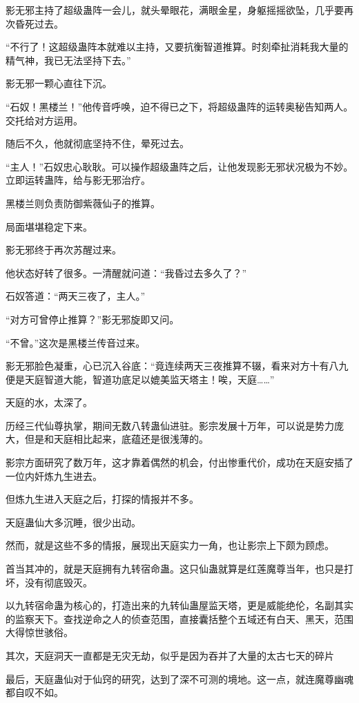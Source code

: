 \begin{this_body}
影无邪主持了超级蛊阵一会儿，就头晕眼花，满眼金星，身躯摇摇欲坠，几乎要再次昏死过去。

“不行了！这超级蛊阵本就难以主持，又要抗衡智道推算。时刻牵扯消耗我大量的精气神，我已无法坚持下去。”

影无邪一颗心直往下沉。

“石奴！黑楼兰！”他传音呼唤，迫不得已之下，将超级蛊阵的运转奥秘告知两人。交托给对方运用。

随后不久，他就彻底坚持不住，晕死过去。

“主人！”石奴忠心耿耿。可以操作超级蛊阵之后，让他发现影无邪状况极为不妙。立即运转蛊阵，给与影无邪治疗。

黑楼兰则负责防御紫薇仙子的推算。

局面堪堪稳定下来。

影无邪终于再次苏醒过来。

他状态好转了很多。一清醒就问道：“我昏过去多久了？”

石奴答道：“两天三夜了，主人。”

“对方可曾停止推算？”影无邪旋即又问。

“不曾。”这次是黑楼兰传音过来。

影无邪脸色凝重，心已沉入谷底：“竟连续两天三夜推算不辍，看来对方十有八九便是天庭智道大能，智道功底足以媲美监天塔主！唉，天庭……”

天庭的水，太深了。

历经三代仙尊执掌，期间无数八转蛊仙进驻。影宗发展十万年，可以说是势力庞大，但是和天庭相比起来，底蕴还是很浅薄的。

影宗方面研究了数万年，这才靠着偶然的机会，付出惨重代价，成功在天庭安插了一位内奸炼九生进去。

但炼九生进入天庭之后，打探的情报并不多。

天庭蛊仙大多沉睡，很少出动。

然而，就是这些不多的情报，展现出天庭实力一角，也让影宗上下颇为顾虑。

首当其冲的，就是天庭拥有九转宿命蛊。这只仙蛊就算是红莲魔尊当年，也只是打坏，没有彻底毁灭。

以九转宿命蛊为核心的，打造出来的九转仙蛊屋监天塔，更是威能绝伦，名副其实的监察天下。查找逆命之人的侦查范围，直接囊括整个五域还有白天、黑天，范围大得惊世骇俗。

其次，天庭洞天一直都是无灾无劫，似乎是因为吞并了大量的太古七天的碎片

最后，天庭蛊仙对于仙窍的研究，达到了深不可测的境地。这一点，就连魔尊幽魂都自叹不如。


\end{this_body}
